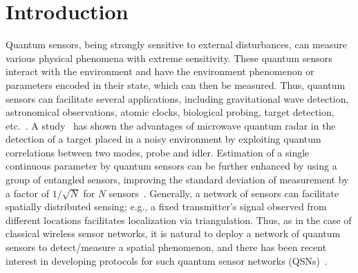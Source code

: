 \section{Introduction}


Quantum sensors, being strongly sensitive to external disturbances, can measure various physical phenomena with extreme sensitivity. 
These quantum sensors interact with the environment 
and have the environment phenomenon or parameters encoded in their state, which can then be measured.
Thus, quantum sensors can facilitate several applications, including gravitational wave detection, astronomical observations, atomic clocks, biological probing, 
target detection, etc.~\cite{photonic_quantum_sensing}.
A study~\cite{quantum_radar} has shown the advantages of microwave quantum radar in the detection of a target placed in a noisy environment by exploiting quantum correlations between two modes, probe and idler.
Estimation of a single continuous parameter by quantum sensors can be further enhanced by using a group of entangled sensors, improving the standard deviation of measurement by a factor of $1/\sqrt{N}$ for $N$ sensors~\cite{Giovannetti_2011}. 
Generally, a network of sensors can facilitate spatially distributed sensing; e.g., a fixed transmitter's signal observed from different locations facilitates localization via triangulation. 
Thus, as in the case of classical wireless sensor networks, it is natural to deploy a network of quantum sensors to detect/measure a spatial phenomenon, and there has been recent interest in developing protocols for such quantum sensor networks (QSNs)~\cite{PhysRevResearch.qsn, PhysRevA.qsn, mpe_2018, Eldredge_2018}.

